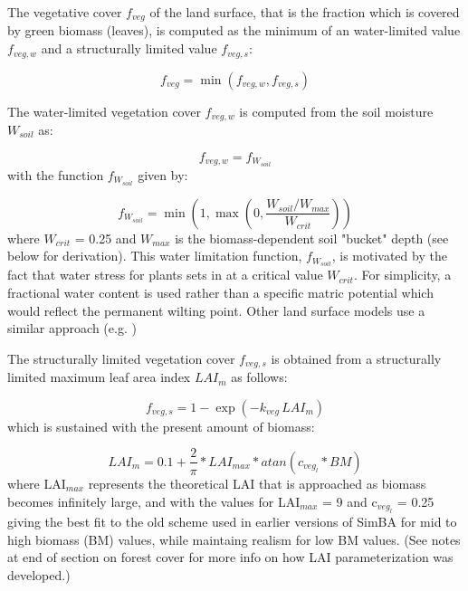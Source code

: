 The vegetative cover $f_{veg}$ of the land surface, that is the fraction which
is covered by green biomass (leaves), is computed as the minimum of an 
water-limited value
$f_{veg,w}$ and a structurally limited value $f_{veg,s}$:

\begin{equation}
f_{veg} = \min{(f_{veg,w}, f_{veg,s})}
\end{equation}

The water-limited vegetation cover $f_{veg,w}$ is computed from the soil moisture $W_{soil}$ as:

\begin{equation}
f_{veg,w} = f_{W_{soil}}
\end{equation}
with the function $f_{W_{soil}}$ given by:

\begin{equation}
\label{eq:waterstressfactor}
f_{W_{soil}} = \min{(1, \max{(0, \frac{W_{soil} / \! W_{max}}{W_{crit}})})}
\end{equation}
where $W_{crit}$ = 0.25 and $W_{max}$ is the biomass-dependent soil "bucket" depth (see below for derivation).  This water limitation function, 
$f_{W_{soil}}$, is motivated by the fact that water stress for plants sets in at a critical 
value $W_{crit}$.  For simplicity, a fractional water content is used rather than 
a specific matric potential which would reflect the permanent wilting point.  Other land surface models use a similar approach (e.g. \cite{albertson2001})

The structurally limited vegetation cover $f_{veg,s}$ is obtained from a structurally limited maximum 
leaf area index $LAI_{m}$ as follows:

\begin{equation}
f_{veg,s} = 1 - \exp{(-k_{veg} \, LAI_{m})}
\end{equation}
which is sustained with the present amount of biomass:

\begin{equation}
LAI_{m} = 0.1 + \frac{2}{\pi} * LAI_{max} * atan(c_{{veg}_l} * BM)
\end{equation}
where LAI$_{max}$ represents the theoretical LAI that is approached as biomass becomes infinitely large, and with the values for LAI$_{max}$ = 9 and c$_{{veg}_l}$ = 0.25 giving the best fit to the old scheme used in earlier versions of SimBA for mid to high biomass (BM) values, while maintaing realism for low BM values.  (See notes at end of section on forest cover for more info on how LAI parameterization was developed.)

